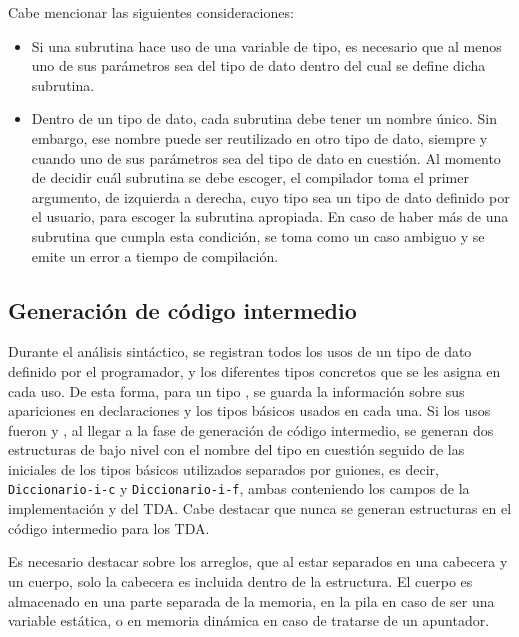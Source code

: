 {{Cabe mencionar las siguientes consideraciones:

\begin{itemize}

  \item Si una subrutina hace uso de una variable de tipo, es necesario que al
  menos uno de sus parámetros sea del tipo de dato dentro del cual se define
  dicha subrutina.

  \item Dentro de un tipo de dato, cada subrutina debe tener un nombre único.
  Sin embargo, ese nombre puede ser reutilizado en otro tipo de dato, siempre y
  cuando uno de sus parámetros sea del tipo de dato en cuestión. Al momento de
  decidir cuál subrutina se debe escoger, el compilador toma el primer
  argumento, de izquierda a derecha, cuyo tipo sea un tipo de dato definido por
  el usuario, para escoger la subrutina apropiada. En caso de haber más de una
  subrutina que cumpla esta condición, se toma como un caso ambiguo y se emite
  un error a tiempo de compilación.

\end{itemize}

\subsection{Generación de código intermedio}

Durante el análisis sintáctico, se registran todos los usos de un tipo de dato
definido por el programador, y los diferentes tipos concretos que se les asigna
en cada uso. De esta forma, para un tipo , se guarda
la información sobre sus apariciones en declaraciones y los tipos básicos usados
en cada una. Si los usos fueron  y
, al llegar a la fase de generación de código
intermedio, se generan dos estructuras de bajo nivel con el nombre del tipo en
cuestión seguido de las iniciales de los tipos básicos utilizados separados por
guiones, es decir, \texttt{Diccionario-i-c} y \texttt{Diccionario-i-f}, ambas
conteniendo los campos de la implementación y del TDA. Cabe destacar que nunca
se generan estructuras en el código intermedio para los TDA.

Es necesario destacar sobre los arreglos, que al estar separados en una cabecera
y un cuerpo, solo la cabecera es incluida dentro de la estructura. El cuerpo es
almacenado en una parte separada de la memoria, en la pila en caso de ser una
variable estática, o en memoria dinámica en caso de tratarse de un apuntador.

}}
